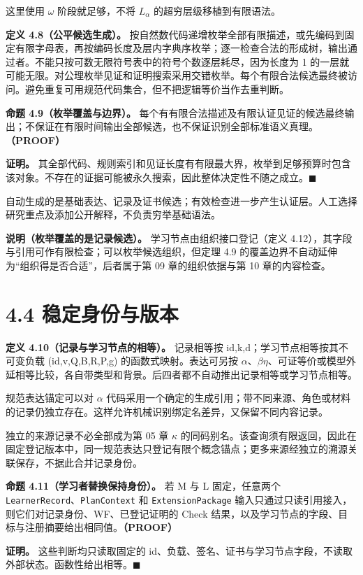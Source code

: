 \documentclass[UTF8,a4paper,zihao=-4,fontset=windows,openany]{ctexbook}
\newcommand{\mcsbrk}{\penalty 200\relax}
\begin{document}
这里使用 \(\omega\) 阶段就足够，不将 \(L_\alpha\) 的超穷层级移植到有限语法。

\textbf{定义 4.8（公平候选生成）。} 按自然数代码递增枚举全部有限描述，或先编码到固定有限字母表，再按编码长度及层内字典序枚举；逐一检查合法的形成树，输出通过者。不能只按可数无限符号表中的符号个数逐层耗尽，因为长度为 1 的一层就可能无限。对公理枚举见证和证明搜索采用交错枚举。每个有限合法候选最终被访问。避免重复可用规范代码集合，但不把逻辑等价当作去重判断。

\textbf{命题 4.9（枚举覆盖与边界）。} 每个有有限合法描述及有限认证见证的候选最终输出；不保证在有限时间输出全部候选，也不保证识别全部标准语义真理。\textbf{（PROOF）}

\textbf{证明。} 其全部代码、规则索引和见证长度有有限最大界，枚举到足够预算时包含该对象。不存在的证据可能被永久搜索，因此整体决定性不随之成立。\(\blacksquare\)

自动生成的是基础表达、记录及证书候选；有效检查进一步产生认证层。人工选择研究重点及添加公开解释，不负责穷举基础语法。

\textbf{说明（枚举覆盖的是记录候选）。} 学习节点由组织接口登记（定义 4.12），其字段与引用可作有限检查；可以枚举候选组织，但定理 4.9 的覆盖边界不自动延伸为“组织得是否合适”，后者属于第 09 章的组织依据与第 10 章的内容检查。

\section{4.4 稳定身份与版本}
\textbf{定义 4.10（记录与学习节点的相等）。} 记录相等按 id,k,d；学习节点相等按其不可变负载 (id,v,Q,B,R,P,g) 的函数式映射。表达可另按 \(\alpha\)、\(\beta\eta\)、可证等价或模型外延相等比较，各自带类型和背景。后四者都不自动推出记录相等或学习节点相等。

规范表达锚定可以对 \(\alpha\) 代码采用一个确定的生成引用；带不同来源、角色或材料的记录仍独立存在。这样允许机械识别绑定名差异，又保留不同内容记录。

独立的来源记录不必全部成为第 05 章 \(\kappa\) 的同码别名。该查询须有限返回，因此在固定登记版本中，同一规范表达只登记有限个概念锚点；更多来源经独立的溯源关联保存，不据此合并记录身份。

\textbf{命题 4.11（学习者替换保持身份）。} 若 M 与 L 固定，任意两个 \texttt{LearnerRecord}、\texttt{PlanContext} 和 \texttt{Extens\mcsbrk{}ionPac\mcsbrk{}kage} 输入只通过只读引用接入，则它们对记录身份、WF、已登记证明的 Check 结果，以及学习节点的字段、目标与注册摘要给出相同值。\textbf{（PROOF）}

\textbf{证明。} 这些判断均只读取固定的 id、负载、签名、证书与学习节点字段，不读取外部状态。函数性给出相等。\(\blacksquare\)
\end{document}
